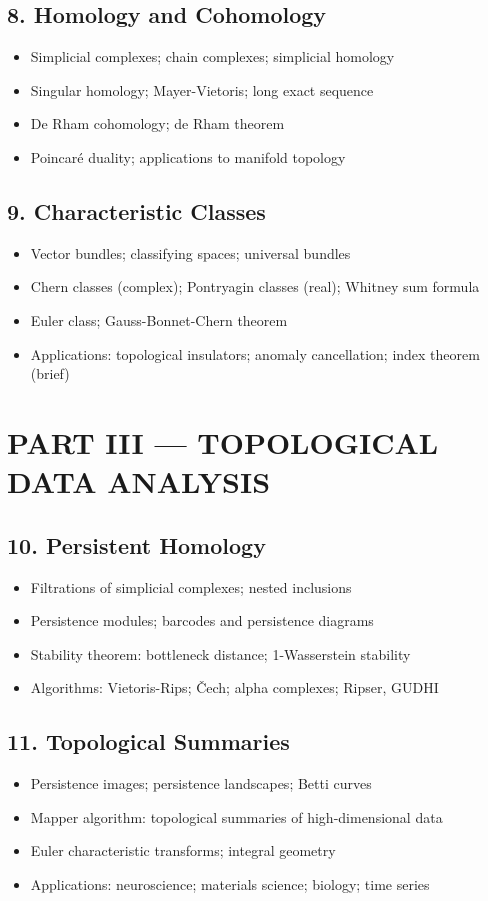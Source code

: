 \subsection{8. Homology and Cohomology}
\begin{itemize}
\item Simplicial complexes; chain complexes; simplicial homology
\item Singular homology; Mayer-Vietoris; long exact sequence
\item De Rham cohomology; de Rham theorem
\item Poincar\'e duality; applications to manifold topology
\end{itemize}

\subsection{9. Characteristic Classes}
\begin{itemize}
\item Vector bundles; classifying spaces; universal bundles
\item Chern classes (complex); Pontryagin classes (real); Whitney sum formula
\item Euler class; Gauss-Bonnet-Chern theorem
\item Applications: topological insulators; anomaly cancellation; index theorem (brief)
\end{itemize}

\section{PART III --- TOPOLOGICAL DATA ANALYSIS}

\subsection{10. Persistent Homology}
\begin{itemize}
\item Filtrations of simplicial complexes; nested inclusions
\item Persistence modules; barcodes and persistence diagrams
\item Stability theorem: bottleneck distance; 1-Wasserstein stability
\item Algorithms: Vietoris-Rips; \v{C}ech; alpha complexes; Ripser, GUDHI
\end{itemize}

\subsection{11. Topological Summaries}
\begin{itemize}
\item Persistence images; persistence landscapes; Betti curves
\item Mapper algorithm: topological summaries of high-dimensional data
\item Euler characteristic transforms; integral geometry
\item Applications: neuroscience; materials science; biology; time series
\end{itemize}

